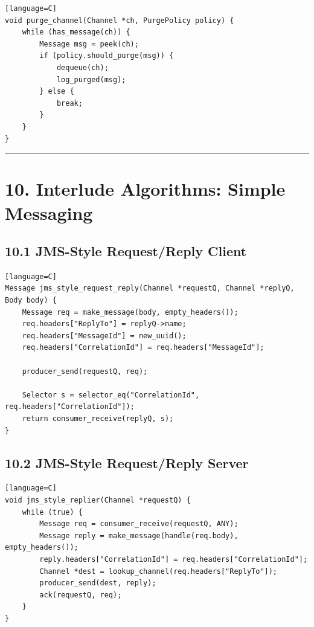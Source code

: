 \documentclass[11pt]{article}
\begin{document}
\begin{verbatim}[language=C]
void purge_channel(Channel *ch, PurgePolicy policy) {
    while (has_message(ch)) {
        Message msg = peek(ch);
        if (policy.should_purge(msg)) {
            dequeue(ch);
            log_purged(msg);
        } else {
            break;
        }
    }
}
\end{verbatim}

\begin{center}\rule{0.5\linewidth}{0.5pt}\end{center}

\section{10. Interlude Algorithms: Simple
Messaging}\label{interlude-algorithms-simple-messaging}

\subsection{10.1 JMS-Style Request/Reply
Client}\label{jms-style-requestreply-client}

\begin{verbatim}[language=C]
Message jms_style_request_reply(Channel *requestQ, Channel *replyQ, Body body) {
    Message req = make_message(body, empty_headers());
    req.headers["ReplyTo"] = replyQ->name;
    req.headers["MessageId"] = new_uuid();
    req.headers["CorrelationId"] = req.headers["MessageId"];

    producer_send(requestQ, req);

    Selector s = selector_eq("CorrelationId", req.headers["CorrelationId"]);
    return consumer_receive(replyQ, s);
}
\end{verbatim}

\subsection{10.2 JMS-Style Request/Reply
Server}\label{jms-style-requestreply-server}

\begin{verbatim}[language=C]
void jms_style_replier(Channel *requestQ) {
    while (true) {
        Message req = consumer_receive(requestQ, ANY);
        Message reply = make_message(handle(req.body), empty_headers());
        reply.headers["CorrelationId"] = req.headers["CorrelationId"];
        Channel *dest = lookup_channel(req.headers["ReplyTo"]);
        producer_send(dest, reply);
        ack(requestQ, req);
    }
}
\end{verbatim}
\end{document}
